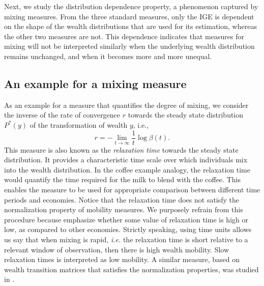 \documentclass[11pt]{article}
\newcommand{\blue}[1]{{\color{blue} #1}}
\newcommand{\ie}{{\it i.e.}\xspace}
\newcommand{\YB}[1]{\blue{{\it YB: #1 YB}}}
\newcommand{\be}{\begin{equation}}
\newcommand{\ee}{\end{equation}}
\numberwithin{equation}{section}
\begin{document}
Next, we study the distribution dependence property, a phenomenon captured by mixing measures. From the three standard measures, only the IGE is dependent on the shape of the wealth distributions that are used for its estimation, whereas the other two measures are not. This dependence indicates that measures for mixing will not be interpreted similarly when the underlying wealth distribution remains unchanged, and when it becomes more and more unequal.



\subsection{An example for a mixing measure}
\label{sec:relaxation-time}
As an example for a measure that quantifies the degree of mixing, we consider the inverse of the rate of convergence $r$ towards the steady state distribution $P^*(y)$ of the transformation of wealth $y$, i.e.,
%
\be
    r = - \lim_{t \to \infty} \frac{1}{t} \log \beta(t).
\ee
%
This measure is also known as the \textit{relaxation time} towards the steady state distribution. It provides a characteristic time scale over which individuals mix into the wealth distribution. In the coffee example analogy, the relaxation time would quantify the time required for the milk to blend with the coffee. This enables the measure to be used for appropriate comparison between different time periods and economies. Notice that the relaxation time does not satisfy the normalization property of mobility measures. We purposely refrain from this procedure because emphasize whether some value of relaxation time is high or low, as compared to other economies. Strictly speaking, using time units allows us say that when mixing is rapid, \ie the relaxation time is short relative to a relevant window of observation, then there is high wealth mobility. Slow relaxation times is interpreted as low mobility. A similar measure, based on wealth transition matrices that satisfies the normalization properties, was studied in \citep{Shorrocks1978}.
\end{document}
